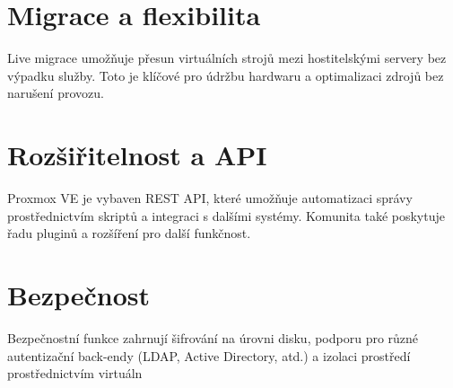 \section{Migrace a flexibilita}
Live migrace umožňuje přesun virtuálních strojů mezi hostitelskými servery bez výpadku služby. Toto je klíčové pro údržbu hardwaru a optimalizaci zdrojů bez narušení provozu.

\section{Rozšiřitelnost a API}
Proxmox VE je vybaven REST API, které umožňuje automatizaci správy prostřednictvím skriptů a integraci s dalšími systémy. Komunita také poskytuje řadu pluginů a rozšíření pro další funkčnost.

\section{Bezpečnost}
Bezpečnostní funkce zahrnují šifrování na úrovni disku, podporu pro různé autentizační back-endy (LDAP, Active Directory, atd.) a izolaci prostředí prostřednictvím virtuáln